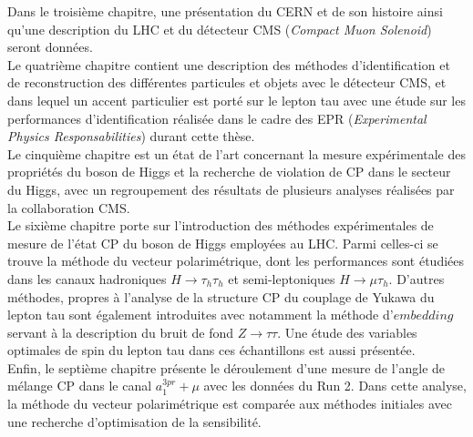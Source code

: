 Dans le troisième chapitre, une présentation du CERN et de son histoire ainsi qu'une description du LHC et du détecteur CMS (\textit{Compact Muon Solenoid}) seront données. \\

Le quatrième chapitre contient une description des méthodes d'identification et de reconstruction des différentes particules et objets avec le détecteur CMS, et dans lequel un accent particulier est porté sur le lepton tau avec une étude sur les performances d'identification réalisée dans le cadre des EPR (\textit{Experimental Physics Responsabilities}) durant cette thèse. \\

Le cinquième chapitre est un état de l'art concernant la mesure expérimentale des propriétés du boson de Higgs et la recherche de violation de CP dans le secteur du Higgs, avec un regroupement des résultats de plusieurs analyses réalisées par la collaboration CMS. \\

Le sixième chapitre porte sur l'introduction des méthodes expérimentales de mesure de l'état CP du boson de Higgs employées au LHC. Parmi celles-ci se trouve la méthode du vecteur polarimétrique, dont les performances sont étudiées dans les canaux hadroniques $H\to\tau_h\tau_h$ et semi-leptoniques $H\to\mu\tau_h$. D'autres méthodes, propres à l'analyse de la structure CP du couplage de Yukawa du lepton tau sont également introduites avec notamment la méthode d'$embedding$ servant à la description du bruit de fond $Z\to\tau\tau$. Une étude des variables optimales de spin du lepton tau dans ces échantillons est aussi présentée. \\

Enfin, le septième chapitre présente le déroulement d'une mesure de l'angle de mélange CP dans le canal $a_1^{3pr}+\mu$ avec les données du Run 2. Dans cette analyse, la méthode du vecteur polarimétrique est comparée aux méthodes initiales avec une recherche d'optimisation de la sensibilité.